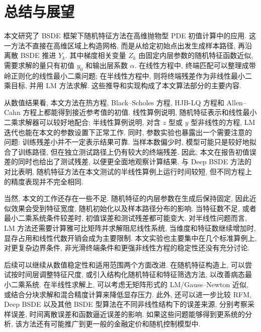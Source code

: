 
\chapter{总结与展望}\label{ch:conclusion}
  本文研究了 BSDE 框架下随机特征方法在高维抛物型 PDE 初值计算中的应用.
  这一方法不直接在高维区域上构造网格, 而是从给定初始点出发生成样本路径,
  再沿离散 BSDE 推进 $Y_k$.
  其中梯度相关变量 $Z_k$ 由固定内层参数的随机特征函数近似,
  需要求解的量只有初值 $y_0$ 和输出层系数 $\alpha$.
  在线性方程中, 终端匹配可以整理成带岭正则化的线性最小二乘问题;
  在半线性方程中, 则将终端残差作为非线性最小二乘目标, 并用 LM 方法求解.
  这些推导和实现构成了本文算法部分的主要内容.

  从数值结果看, 本文方法在热方程, Black--Scholes 方程, HJB-LQ 方程和 Allen--Cahn 方程上都能得到接近参考值的初值.
  线性算例说明, 随机特征表示和线性最小二乘求解器可以较好地配合;
  半线性算例说明, 对含 $z$ 型或 $y$ 型非线性的方程, LM 迭代也能在本文的参数设置下正常工作.
  同时, 参数实验也暴露出一个需要注意的问题:
  训练残差小并不一定表示结果可靠.
  当样本数偏少时, 模型可能只是较好地拟合了训练路径,
  但在独立测试路径上仍有较大的终端残差.
  因此, 本文在报告初值误差的同时也给出了测试残差, 以便更全面地观察计算结果.
  与 Deep BSDE 方法的对比表明, 随机特征方法在本文测试的半线性算例上运行时间较短,
  但不同方程上的精度表现并不完全相同.

  当然, 本文的工作还存在一些不足.
  随机特征的内层参数在生成后保持固定,
  因此近似效果会受到特征宽度, 随机初始化以及样本路径分布的影响.
  当特征数不足, 或者最小二乘系统条件较差时, 初值误差和测试残差都可能变大.
  对半线性问题而言, LM 方法还需要计算雅可比矩阵并求解阻尼线性系统,
  当维度和特征数继续增加时, 显存占用和线性代数开销会成为主要限制.
  本文实验也主要集中在几个标准算例上,
  对更复杂边界条件, 非光滑终端条件和更强非线性方程的稳定性还没有充分讨论.

  后续可以继续从数值稳定性和适用范围两个方面改进.
  在随机特征构造上, 可以尝试按时间层调整特征尺度,
  或引入结构化随机特征和特征筛选方法, 以改善病态最小二乘系统.
  在半线性求解上, 可以考虑无矩阵形式的 LM/Gauss--Newton 近似,
  或结合分块求解和混合精度计算来降低显存压力.
  此外, 还可以进一步比较 RFM, Deep BSDE 以及其他 BSDE 型算法在不同非线性结构下的误差来源,
  分别考察采样误差, 时间离散误差和函数逼近误差的影响.
  如果这些问题能够得到更系统的分析,
  该方法还有可能推广到更一般的金融定价和随机控制模型中.
